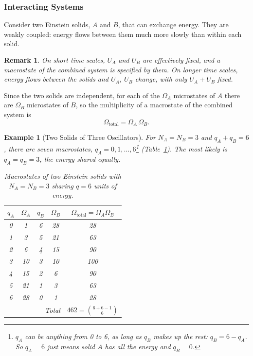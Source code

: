 \documentclass{article}
\newtheorem{example}{Example}
\newtheorem{remark}{Remark}
\begin{document}
\subsubsection{Interacting Systems}
Consider two Einstein solids, $A$ and $B$, that can exchange energy. They are weakly coupled: energy flows between them much more slowly than within each solid.
\begin{remark}
    On short time scales, $U_A$ and $U_B$ are effectively fixed, and a macrostate of the combined system is specified by them. On longer time scales, energy flows between the solids and $U_A$, $U_B$ change, with only $U_A + U_B$ fixed.
\end{remark}
Since the two solids are independent, for each of the $\Omega_A$ microstates of $A$ there are $\Omega_B$ microstates of $B$, so the multiplicity of a macrostate of the combined system is
\begin{equation}
    \label{eq:combined-multiplicity}
    \Omega_{\text{total}} = \Omega_A\,\Omega_B.
\end{equation}
\begin{example}[Two Solids of Three Oscillators]
    \label{ex:two-einstein-solids}
    For $N_A = N_B = 3$ and $q_A + q_B = 6$, there are seven macrostates, $q_A = 0, 1, \dots, 6$\footnote{$q_A$ can be anything from 0 to 6, as long as $q_B$ makes up the rest: $q_B = 6 - q_A$. So $q_A = 6$ just means solid $A$ has all the energy and $q_B = 0$.} (Table~\ref{tab:einstein-solids}). The most likely is $q_A = q_B = 3$, the energy shared equally.
    \begin{table}[H]
        \centering
        \begin{tabular}{cc|cc|c}
            $q_A$ & $\Omega_A$ & $q_B$ & $\Omega_B$ & $\Omega_{\text{total}} = \Omega_A\Omega_B$ \\
            \hline
            0 & 1  & 6 & 28 & 28  \\
            1 & 3  & 5 & 21 & 63  \\
            2 & 6  & 4 & 15 & 90  \\
            3 & 10 & 3 & 10 & 100 \\
            4 & 15 & 2 & 6  & 90  \\
            5 & 21 & 1 & 3  & 63  \\
            6 & 28 & 0 & 1  & 28  \\
            \hline
            \multicolumn{4}{r|}{Total} & $462 = \binom{6+6-1}{6}$
        \end{tabular}
        \caption{Macrostates of two Einstein solids with $N_A = N_B = 3$ sharing $q = 6$ units of energy.}
        \label{tab:einstein-solids}
    \end{table}
\end{example}
\end{document}
